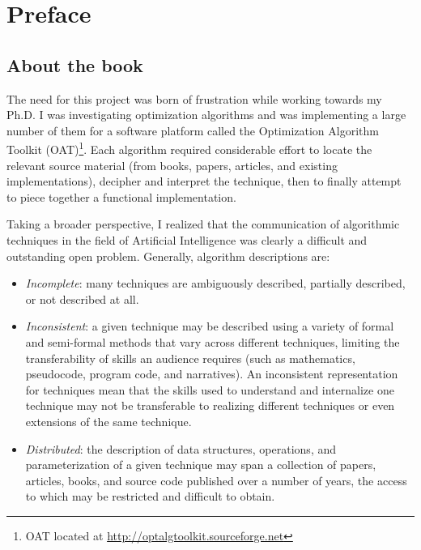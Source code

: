 

\chapter*{Preface}

% 
% 
\section*{About the book}
The need for this project was born of frustration while working towards my Ph.D. I was investigating optimization algorithms and was implementing a large number of them for a software platform called the Optimization Algorithm Toolkit (OAT)\footnote{OAT located at \url{http://optalgtoolkit.sourceforge.net}}. Each algorithm required considerable effort to locate the relevant source material (from books, papers, articles, and existing implementations), decipher and interpret the technique, then to finally attempt to piece together a functional implementation. 

Taking a broader perspective, I realized that the communication of algorithmic techniques in the field of Artificial Intelligence was clearly a difficult and outstanding open problem. Generally, algorithm descriptions are:

\begin{itemize}
	\item \emph{Incomplete}: many techniques are ambiguously described, partially described, or not described at all.
	\item \emph{Inconsistent}: a given technique may be described using a variety of formal and semi-formal methods that vary across different techniques, limiting the transferability of skills an audience requires (such as mathematics, pseudocode, program code, and narratives). An inconsistent representation for techniques mean that the skills used to understand and internalize one technique may not be transferable to realizing different techniques or even extensions of the same technique.
	\item \emph{Distributed}: the description of data structures, operations, and parameterization of a given technique may span a collection of papers, articles, books, and source code published over a number of years, the access to which may be restricted and difficult to obtain.
\end{itemize}

